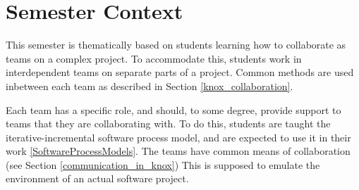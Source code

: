 \section{Semester Context}
This semester is thematically based on students learning how to collaborate as teams on a complex project. 
To accommodate this, students work in interdependent teams on separate parts of a project. 
Common methods are used inbetween each team as described in Section \ref{knox_collaboration}. 

Each team has a specific role, and should, to some degree, provide support to teams that they are collaborating with.
To do this, students are taught the iterative-incremental software process model, and are expected to use it in their work \ref{SoftwareProcessModels}. The teams have common means of collaboration (see Section \ref{communication_in_knox})
This is supposed to emulate the environment of an actual software project. 


% 



% 
